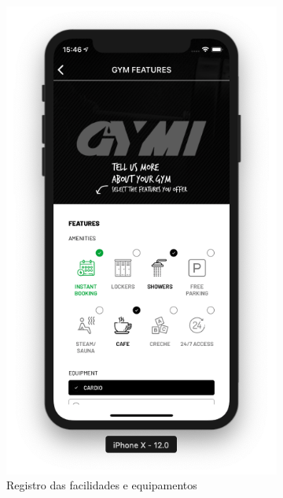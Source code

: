 \begin{figure}[H]
\begin{subfigure}[b]{0.3\textwidth}
        \includegraphics[width=\textwidth]{pfc/figuras/register-gym-amenities.png}
        \caption{Registro das facilidades e equipamentos}
        \label{fig:register-gym-amenities}
    \end{subfigure}
    ~
    \begin{subfigure}[b]{0.3\textwidth}

\end{subfigure}
\end{figure}
